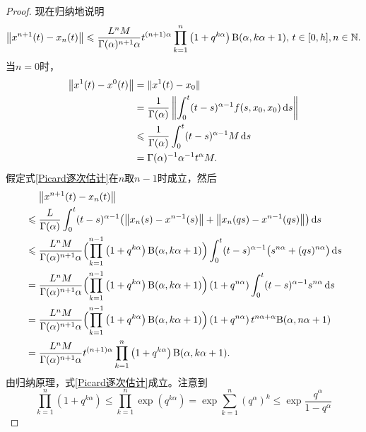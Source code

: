 \begin{proof}
    现在归纳地说明
    \begin{equation}\label{Picard逐次估计}
        \left\| x^{n+1}(t) - x_n(t) \right\|\leqslant \frac{L^n M}{\Gamma(\alpha)^{n+1} \alpha} t^{(n+1)\alpha} \prod_{k=1}^n \left(1+q^{k\alpha}\right) \mathrm{B}(\alpha, k\alpha+1),\,t\in [0,h],n\in\mathbb{N}.
    \end{equation}
    当$n=0$时，
    \begin{align*}
        \left\| x^1(t)-x^0(t) \right\|&=\| x^1(t)-x_0 \|\\
        &=\frac{1}{\Gamma(\alpha)}\left\| \int_0^t (t-s)^{\alpha-1} f(s,x_0,x_0)\mathop{}\!\mathrm{d} s\right\|\\
        &\leqslant \frac{1}{\Gamma(\alpha)}\int_0^t (t-s)^{\alpha-1} M\mathop{}\!\mathrm{d} s\\
        &=\Gamma(\alpha)^{-1} \alpha^{-1} t^\alpha M.
    \end{align*}
    假定式\eqref{Picard逐次估计}在$n$取$n-1$时成立，然后
    \begin{align*}
        &\mathrel{\phantom{\leqslant}} \left\| x^{n+1}(t)-x_n(t) \right\| \\ &\leqslant \frac{L}{\Gamma(\alpha)}\int_0^t (t-s)^{\alpha-1} \bigl(\left\|x_n(s)-x^{n-1}(s)\right\| + \left\|x_n(qs)-x^{n-1}(qs)\right\|\bigr) \mathop{}\!\mathrm{d} s\\
        &\leqslant \frac{L^{n} M}{\Gamma(\alpha)^{n+1} \alpha} \Bigl(\prod_{k=1}^{n-1}\left(1+q^{k\alpha}\right) \mathrm{B}(\alpha, k\alpha+1)\Bigr)\int_0^t (t-s)^{\alpha-1} \bigl(s^{n\alpha} + (qs)^{n\alpha}\bigr) \mathop{}\!\mathrm{d} s\\
        &=\frac{L^{n} M}{\Gamma(\alpha)^{n+1} \alpha} \Bigl(\prod_{k=1}^{n-1}\left(1+q^{k\alpha}\right) \mathrm{B}(\alpha, k\alpha+1)\Bigr) \left(1+q^{n\alpha}\right) \int_0^t (t-s)^{\alpha-1} s^{n\alpha} \mathop{}\!\mathrm{d} s\\
        &=\frac{L^{n} M}{\Gamma(\alpha)^{n+1} \alpha} \Bigl(\prod_{k=1}^{n-1}\left(1+q^{k\alpha}\right) \mathrm{B}(\alpha, k\alpha+1)\Bigr) \left(1+q^{n\alpha}\right) t^{n\alpha+\alpha}\mathrm{B}(\alpha, n\alpha+1)\\
        &=\frac{L^n M}{\Gamma(\alpha)^{n+1} \alpha} t^{(n+1)\alpha} \prod_{k=1}^n \left(1+q^{k\alpha}\right) \mathrm{B}(\alpha, k\alpha+1).
    \end{align*}
    由归纳原理，式\eqref{Picard逐次估计}成立。注意到
    \begin{equation*}
        \prod_{k=1}^n \left(1+q^{k\alpha}\right)\leqslant \prod_{k=1}^n \exp\left(q^{k\alpha}\right)=\exp \sum_{k=1}^n \left(q^\alpha\right)^k\leqslant \exp \frac{q^\alpha}{1-q^\alpha}

\end{equation*}
\end{proof}
